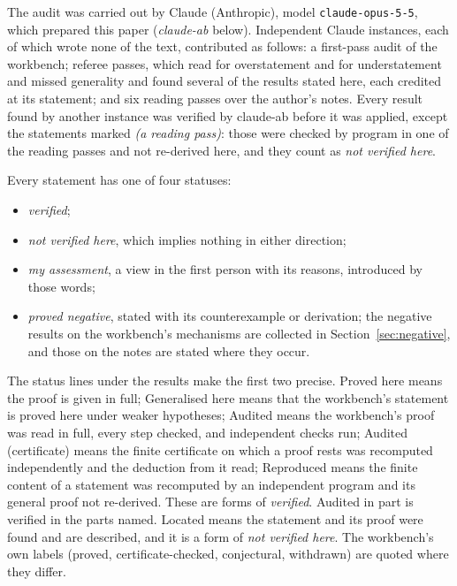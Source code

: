 The audit was carried out by Claude (Anthropic), model \texttt{claude-opus-5-5}, which prepared this paper (\emph{claude-ab} below). Independent Claude instances, each of which wrote none of the text, contributed as follows: a first-pass audit of the workbench; referee passes, which read for overstatement and for understatement and missed generality and found several of the results stated here, each credited at its statement; and six reading passes over the author's notes. Every result found by another instance was verified by claude-ab before it was applied, except the statements marked \emph{(a reading pass)}: those were checked by program in one of the reading passes and not re-derived here, and they count as \emph{not verified here}.

Every statement has one of four statuses:
\begin{itemize}
\item \emph{verified};
\item \emph{not verified here}, which implies nothing in either direction;
\item \emph{my assessment}, a view in the first person with its reasons, introduced by those words;
\item \emph{proved negative}, stated with its counterexample or derivation; the negative results on the workbench's mechanisms are collected in Section~\ref{sec:negative}, and those on the notes are stated where they occur.
\end{itemize}
The status lines under the results make the first two precise. \textsf{Proved here} means the proof is given in full; \textsf{Generalised here} means that the workbench's statement is proved here under weaker hypotheses; \textsf{Audited} means the workbench's proof was read in full, every step checked, and independent checks run; \textsf{Audited (certificate)} means the finite certificate on which a proof rests was recomputed independently and the deduction from it read; \textsf{Reproduced} means the finite content of a statement was recomputed by an independent program and its general proof not re-derived. These are forms of \emph{verified}. \textsf{Audited in part} is verified in the parts named. \textsf{Located} means the statement and its proof were found and are described, and it is a form of \emph{not verified here}. The workbench's own labels (proved, certificate-checked, conjectural, withdrawn) are quoted where they differ.

